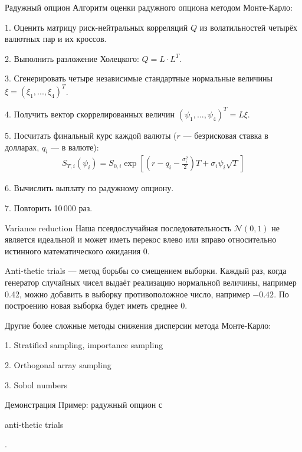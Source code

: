 \documentclass{beamer}
\newcommand{\en}[1]{\begin{otherlanguage}{english}#1\end{otherlanguage}}
\begin{document}
\begin{frame}{Радужный опцион}
\justify
Алгоритм оценки радужного опциона методом Монте-Карло:

1. Оценить матрицу риск-нейтральных корреляций $Q$ из волатильностей четырёх валютных пар и их кроссов.

2. Выполнить разложение Холецкого: $Q = L \cdot L^T$.

3. Сгенерировать четыре независимые стандартные нормальные величины $\xi = (\xi_1,...,\xi_4)^T$.

4. Получить вектор скоррелированных величин $(\psi_1,...,\psi_4)^T = L\xi$.

5. Посчитать финальный курс каждой валюты ($r$ --- безрисковая ставка в долларах, $q_i$ --- в валюте):
\begin{align*}
S_{T,i}(\psi_i) = S_{0,i}\exp\left[\left(r - q_i - \frac{\sigma_i^2}{2}\right)T + \sigma_i\psi_i\sqrt{T}\right]
\end{align*}

6. Вычислить выплату по радужному опциону.

7. Повторить 10\,000 раз.
\end{frame}



\begin{frame}{Variance reduction}
\justify
Наша псевдослучайная последовательность $\mathcal{N}(0,1)$ не является идеальной и может иметь перекос влево или вправо относительно истинного математического ожидания 0.

\justify
\alert{Anti-thetic trials} --- метод борьбы со смещением выборки. Каждый раз, когда генератор случайных чисел выдаёт реализацию нормальной величины, например 0.42, можно добавить в выборку противоположное число, например $-0.42$. По построению новая выборка будет иметь среднее 0.

\justify
Другие более сложные методы снижения дисперсии метода Монте-Карло:

1. Stratified sampling, importance sampling

2. Orthogonal array sampling

3. Sobol numbers
\end{frame}



\begin{frame}{Демонстрация}
\justify
Пример: радужный опцион с \en{anti-thetic trials}.
\end{frame}
\end{document}
